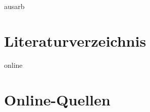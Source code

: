 \documentclass[11pt]{article} %
\begin{document}
\listoffigures %
\listoftables %
%
\begin{btSect}{ausarb}
\section*{Literaturverzeichnis}
\btPrintCited
\end{btSect}
\begin{btSect}{online}
\section*{Online-Quellen}
\btPrintCited
\end{btSect}
\end{document}
